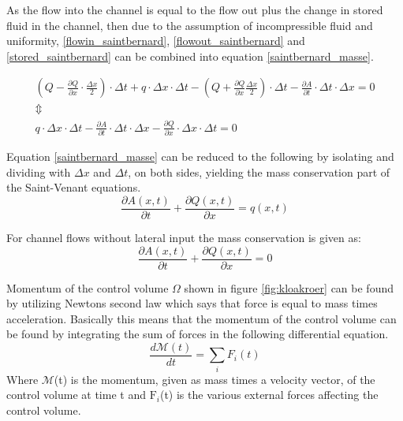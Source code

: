 As the flow into the channel is equal to the flow out plus the change in stored fluid in the channel, then due to the assumption of incompressible fluid and uniformity, \ref{flowin_saintbernard}, \ref{flowout_saintbernard} and \ref{stored_saintbernard} can be combined into equation \ref{saintbernard_masse}. 

\begin{equation}
\begin{array}{l}
	\left(Q - \frac{\partial Q}{\partial x}\cdot \frac{\Delta x}{2}\right) \cdot \Delta t + q \cdot \Delta x \cdot \Delta t - \left(Q + \frac{\partial Q}{ \partial x} \frac{\Delta x}{2} \right) \cdot \Delta t - \frac{\partial A}{\partial t}\cdot \Delta t 
	\cdot \Delta x = 0 \\ 
\Updownarrow \\
q \cdot \Delta x \cdot \Delta t -\frac{\partial A}{\partial t} \cdot \Delta t 
	\cdot \Delta x - \frac{\partial Q}{\partial x} \cdot \Delta x \cdot \Delta t  = 0 
\end{array}
\label{saintbernard_masse}
\end{equation}

Equation \ref{saintbernard_masse} can be reduced to the following by isolating and dividing with $\Delta x$ and $\Delta t$, on both sides, yielding the mass conservation part of the Saint-Venant equations.
\begin{equation}	
\frac{\partial A(x,t)}{\partial t} + \frac{\partial Q(x,t)}{\partial x}=q(x,t)
\label{saintbernard_mass_lateral}
\end{equation}

For channel flows without lateral input the mass conservation is given as:
\begin{equation}	
\frac{\partial A(x,t)}{\partial t} + \frac{\partial Q(x,t)}{\partial x}=0
\label{saintbernard_mass}
\end{equation}

Momentum of the control volume $\Omega$ shown in figure \ref{fig:kloakroer} can be found by utilizing Newtons second law which says that force is equal to mass times acceleration.
Basically this means that the momentum of the control volume can be found by integrating the sum of forces in the following differential equation.
\begin{equation}
	\frac{d \mathcal{M}(t)}{dt} = \sum_{i}F_i(t)
\end{equation} 
Where $\mathcal{M}$(t) is the momentum, given as mass times a velocity vector, of the control volume at time t and $\text{F}_i$(t) is the various external forces affecting the control volume.

